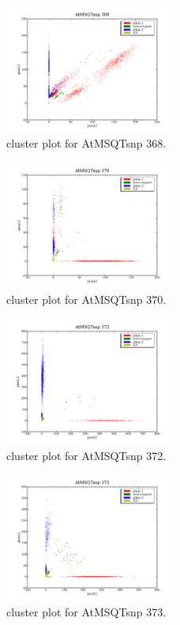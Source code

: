 \begin{figure}[H]
\includegraphics[width=0.5\textwidth]{figures/cluster_plot_AtMSQTsnp_368.png}
\caption{cluster plot for AtMSQTsnp 368.} \label{flAtMSQTsnp368}
\end{figure}

\begin{figure}[H]
\includegraphics[width=0.5\textwidth]{figures/cluster_plot_AtMSQTsnp_370.png}
\caption{cluster plot for AtMSQTsnp 370.} \label{flAtMSQTsnp370}
\end{figure}

\begin{figure}[H]
\includegraphics[width=0.5\textwidth]{figures/cluster_plot_AtMSQTsnp_372.png}
\caption{cluster plot for AtMSQTsnp 372.} \label{flAtMSQTsnp372}
\end{figure}

\begin{figure}[H]
\includegraphics[width=0.5\textwidth]{figures/cluster_plot_AtMSQTsnp_373.png}
\caption{cluster plot for AtMSQTsnp 373.} \label{flAtMSQTsnp373}
\end{figure}

